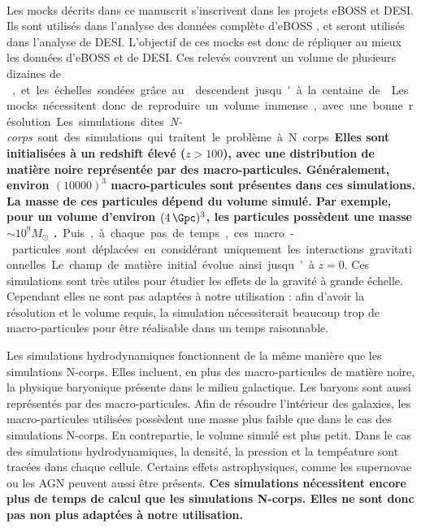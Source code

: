\documentclass[11pt, twoside, a4paper, openright]{report}
\begin{document}
\paragraph{}
Les mocks décrits dans ce manuscrit s'inscrivent dans les projets eBOSS et DESI. Ils sont utilisés dans l'analyse \lya{} des données complète d'eBOSS \citep{CITE:dr16}, et seront utilisés dans l'analyse \lya{} de DESI.
L'objectif de ces mocks est donc de répliquer au mieux les données \lya{} d'eBOSS et de DESI. Ces relevés couvrent un volume de plusieurs dizaines de \si{\cubic\Gpc}, et les échelles sondées grâce au \lya{} descendent jusqu'à la centaine de \si{\kpc}. Les mocks nécessitent donc de reproduire un volume immense, avec une bonne résolution.
Les simulations dites \emph{N-corps} sont des simulations qui traitent le problème à N corps.
\textbf{Elles sont initialisées à un redshift élevé ($z > \num{100}$), avec une distribution de matière noire représentée par des macro-particules. Généralement, environ $(\num{10000})^3$ macro-particules sont présentes dans ces simulations. La masse de ces particules dépend du volume simulé. Par exemple, pour un volume d'environ $(\SI{4}{\Gpc})^3$, les particules possèdent une masse $\sim 10^{9} M_{\odot}$ \citep{Heitmann2019}.}
Puis, à chaque pas de temps, ces macro-particules sont déplacées en considérant uniquement les interactions gravitationnelles. Le champ de matière initial évolue ainsi jusqu'à $z=0$. Ces simulations sont très utiles pour étudier les effets de la gravité à grande échelle. Cependant elles ne sont pas adaptées à notre utilisation : afin d'avoir la résolution et le volume requis, la simulation nécessiterait beaucoup trop de macro-particules pour être réalisable dans un temps raisonnable.

Les simulations hydrodynamiques fonctionnent de la même manière que les simulations N-corps. Elles incluent, en plus des macro-particules de matière noire, la physique baryonique présente dans le milieu galactique. Les baryons sont aussi représentés par des macro-particules. Afin de résoudre l'intérieur des galaxies, les macro-particules utilisées possèdent une masse plus faible que dans le cas des simulations N-corps. En contrepartie, le volume simulé est plus petit. Dans le cas des simulations hydrodynamiques, la densité, la pression et la tempéature sont tracées dans chaque cellule. Certains effets astrophysiques, comme les supernovae ou les AGN peuvent aussi être présents. 
\textbf{Ces simulations nécessitent encore plus de temps de calcul que les simulations N-corps. Elles ne sont donc pas non plus adaptées à notre utilisation.}
\end{document}
